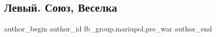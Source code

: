  
 
 
 
 

\subsection{Левый. Союз, Веселка}
\label{sec:02_01_2023.fb.fb_group.mariupol.pre_war.1.levii__soyuz__veselk}

\ifcmt
 author_begin
   author_id fb_group.mariupol.pre_war
 author_end
\fi

